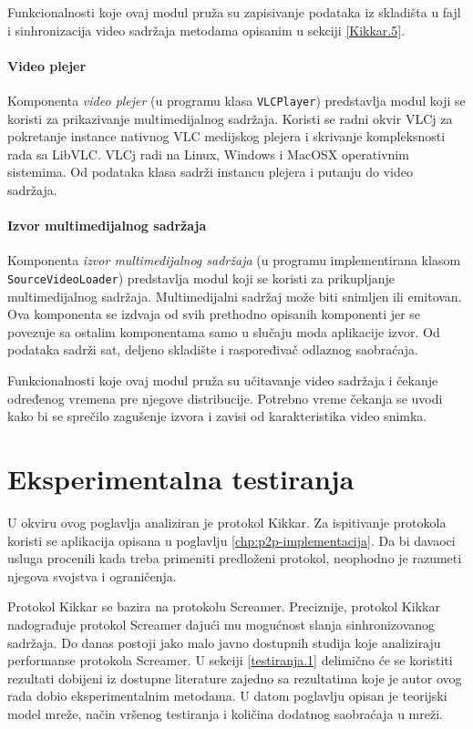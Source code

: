 \documentclass[12pt,oneside]{memoir}
\begin{document}
Funkcionalnosti koje ovaj modul pruža su zapisivanje podataka iz skladišta u fajl i sinhronizacija video sadržaja metodama opisanim u sekciji \ref{Kikkar.5}.


\subsubsection{Video plejer}
\label{implementacija.2.3.8}

Komponenta \textit{video plejer} (u programu klasa \texttt{VLCPlayer}) predstavlja modul koji se koristi za prikazivanje multimedijalnog sadržaja. Koristi se radni okvir VLCj za pokretanje instance nativnog VLC medijskog plejera i skrivanje kompleksnosti rada sa LibVLC. VLCj radi na Linux, Windows i MacOSX operativnim sistemima. Od podataka klasa sadrži instancu plejera i putanju do video sadržaja. 


\subsubsection{Izvor multimedijalnog sadržaja}
\label{implementacija.2.3.9}
Komponenta \textit{izvor multimedijalnog sadržaja} (u programu implementirana klasom \texttt{SourceVideoLoader}) predstavlja modul koji se koristi za prikupljanje multimedijalnog sadržaja. Multimedijalni sadržaj može biti snimljen ili emitovan. Ova komponenta se izdvaja od svih prethodno opisanih komponenti jer se povezuje sa ostalim komponentama samo u slučaju moda aplikacije izvor. Od podataka sadrži sat, deljeno skladište i raspoređivač odlaznog saobraćaja.

Funkcionalnosti koje ovaj modul pruža su učitavanje video sadržaja i čekanje određenog vremena pre njegove distribucije. Potrebno vreme čekanja se uvodi kako bi se sprečilo zagušenje izvora i zavisi od karakteristika video snimka.

\chapter{Eksperimentalna testiranja}
\label{chp:testiranja}

U okviru ovog poglavlja analiziran je protokol Kikkar. Za ispitivanje protokola koristi se aplikacija opisana u poglavlju \ref{chp:p2p-implementacija}. Da bi davaoci usluga procenili kada treba primeniti predloženi protokol, neophodno je razumeti njegova svojstva i ograničenja. 

Protokol Kikkar se bazira na protokolu Screamer. Preciznije, protokol Kikkar nadograđuje protokol Screamer dajući mu mogućnost slanja sinhronizovanog sadržaja. Do danas postoji jako malo javno dostupnih studija koje analiziraju performanse protokola Screamer. U sekciji \ref{testiranja.1} delimično će se koristiti rezultati dobijeni iz dostupne literature zajedno sa rezultatima koje je autor ovog rada dobio eksperimentalnim metodama. U datom poglavlju opisan je teorijski model mreže, način vršenog testiranja i količina dodatnog saobraćaja u mreži.
\end{document}
